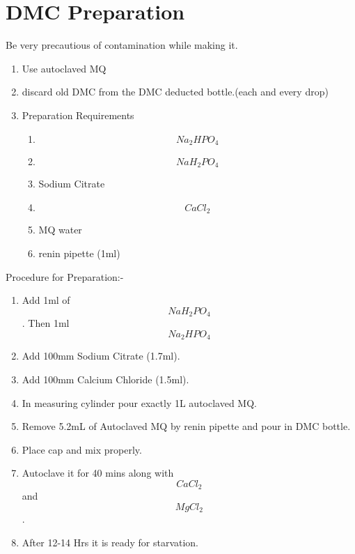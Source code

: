 \documentclass[11pt,twoside,a4paper]{article}
\begin{document}
\section{DMC Preparation}
Be very precautious of contamination while making it.
\begin{enumerate}
	\item Use autoclaved MQ
	\item discard old DMC from the DMC deducted bottle.(each and every drop)
	\item Preparation Requirements
		\begin{enumerate}
			\item \[ Na_2 HPO_4 \]
			\item \[ NaH_2PO_4\]
			\item Sodium Citrate
			\item \[ CaCl_2 \]
			\item MQ water
			\item renin pipette (1ml)
		\end{enumerate}
\end{enumerate}
Procedure for Preparation:-
\begin{enumerate}
	\item Add 1ml of \[ NaH_2PO_4 \]. Then 1ml \[ Na_2HPO_4 \]
	\item Add 100mm Sodium Citrate (1.7ml).
	\item Add 100mm Calcium Chloride (1.5ml).
	\item In measuring cylinder pour exactly 1L autoclaved MQ.
	\item Remove 5.2mL of Autoclaved MQ by renin pipette and pour in DMC bottle.
	\item Place cap and mix properly.
	\item Autoclave it for 40 mins along with \[ CaCl_2 \] and \[ MgCl_2 \].
	\item After 12-14 Hrs it is ready for starvation.
\end{enumerate}
\end{document}
